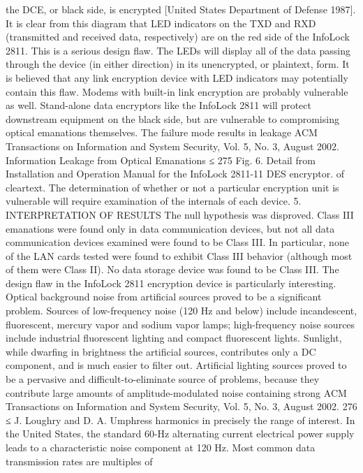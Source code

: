 the DCE, or black side, is encrypted [United States Department of 
Defense 1987]. It is clear from this diagram that LED indicators on the TXD 
and RXD (transmitted and received data, respectively) are on the red side of 
the InfoLock 2811. This is a serious design flaw. The LEDs will display all of 
the data passing through the device (in either direction) in its unencrypted, or 
plaintext, form. 
It is believed that any link encryption device with LED indicators may potentially 
contain this flaw. Modems with built-in link encryption are probably 
vulnerable as well. Stand-alone data encryptors like the InfoLock 2811 will 
protect downstream equipment on the black side, but are vulnerable to compromising 
optical emanations themselves. The failure mode results in leakage 
ACM Transactions on Information and System Security, Vol. 5, No. 3, August 2002.
Information Leakage from Optical Emanations ≤ 275 
Fig. 6. Detail from Installation and Operation Manual for the InfoLock 2811-11 DES encryptor. 
of cleartext. The determination of whether or not a particular encryption unit 
is vulnerable will require examination of the internals of each device. 
5. INTERPRETATION OF RESULTS 
The null hypothesis was disproved. 
Class III emanations were found only in data communication devices, but 
not all data communication devices examined were found to be Class III. In 
particular, none of the LAN cards tested were found to exhibit Class III behavior 
(although most of them were Class II). No data storage device was found to be 
Class III. The design flaw in the InfoLock 2811 encryption device is particularly 
interesting. 
Optical background noise from artificial sources proved to be a significant 
problem. Sources of low-frequency noise (120 Hz and below) include incandescent, 
fluorescent, mercury vapor and sodium vapor lamps; high-frequency noise 
sources include industrial fluorescent lighting and compact fluorescent lights. 
Sunlight, while dwarfing in brightness the artificial sources, contributes only 
a DC component, and is much easier to filter out. Artificial lighting sources 
proved to be a pervasive and difficult-to-eliminate source of problems, because 
they contribute large amounts of amplitude-modulated noise containing strong 
ACM Transactions on Information and System Security, Vol. 5, No. 3, August 2002.
276 ≤ J. Loughry and D. A. Umphress 
harmonics in precisely the range of interest. In the United States, the standard 
60-Hz alternating current electrical power supply leads to a characteristic noise 
component at 120 Hz. Most common data transmission rates are multiples of 
